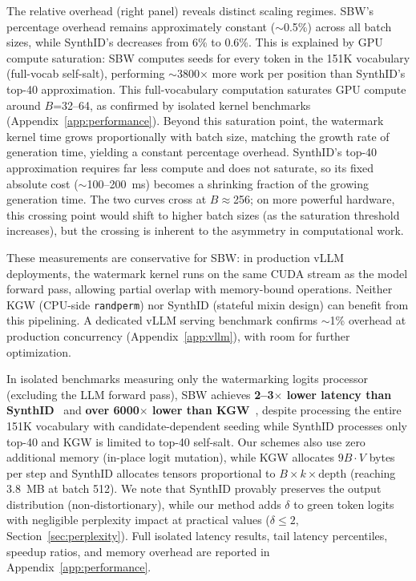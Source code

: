 \documentclass[11pt]{article}
\begin{document}
The relative overhead (right panel) reveals distinct scaling regimes. SBW's percentage overhead remains approximately constant (${\sim}$0.5\%) across all batch sizes, while SynthID's decreases from 6\% to 0.6\%. This is explained by GPU compute saturation: SBW computes seeds for every token in the 151K vocabulary (full-vocab self-salt), performing ${\sim}$3800$\times$ more work per position than SynthID's top-40 approximation. This full-vocabulary computation saturates GPU compute around $B$=32--64, as confirmed by isolated kernel benchmarks (Appendix~\ref{app:performance}). Beyond this saturation point, the watermark kernel time grows proportionally with batch size, matching the growth rate of generation time, yielding a constant percentage overhead. SynthID's top-40 approximation requires far less compute and does not saturate, so its fixed absolute cost (${\sim}$100--200~ms) becomes a shrinking fraction of the growing generation time. The two curves cross at $B{\approx}$256; on more powerful hardware, this crossing point would shift to higher batch sizes (as the saturation threshold increases), but the crossing is inherent to the asymmetry in computational work.

These measurements are conservative for SBW: in production vLLM deployments, the watermark kernel runs on the same CUDA stream as the model forward pass, allowing partial overlap with memory-bound operations. Neither KGW (CPU-side \texttt{randperm}) nor SynthID (stateful mixin design) can benefit from this pipelining. A dedicated vLLM serving benchmark confirms ${\sim}$1\% overhead at production concurrency (Appendix~\ref{app:vllm}), with room for further optimization.

In isolated benchmarks measuring only the watermarking logits processor (excluding the LLM forward pass), SBW achieves \textbf{2--3$\times$ lower latency than SynthID}~\cite{dathathri2024scalable} and \textbf{over 6000$\times$ lower than KGW}~\cite{kirchenbauer2023watermark}, despite processing the entire 151K vocabulary with candidate-dependent seeding while SynthID processes only top-40 and KGW is limited to top-40 self-salt. Our schemes also use zero additional memory (in-place logit mutation), while KGW allocates $9 B \cdot V$ bytes per step and SynthID allocates tensors proportional to $B \times k \times \text{depth}$ (reaching 3.8~MB at batch 512). We note that SynthID provably preserves the output distribution (non-distortionary), while our method adds $\delta$ to green token logits with negligible perplexity impact at practical values ($\delta \leq 2$, Section~\ref{sec:perplexity}). Full isolated latency results, tail latency percentiles, speedup ratios, and memory overhead are reported in Appendix~\ref{app:performance}.
\end{document}
